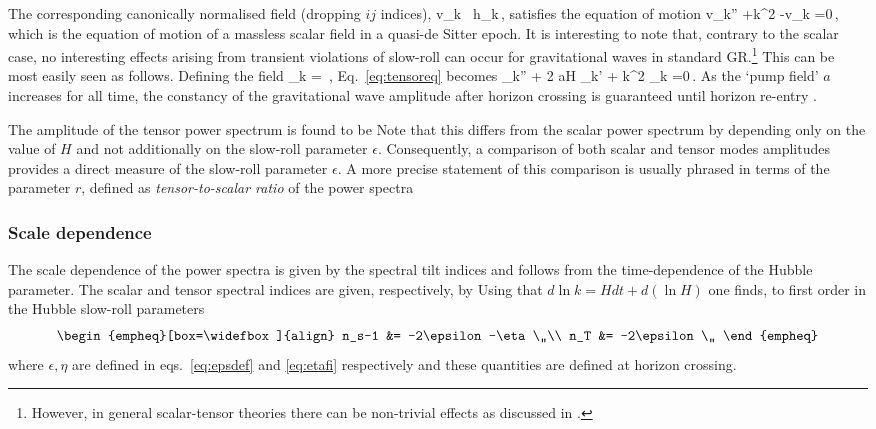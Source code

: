 The corresponding canonically normalised field (dropping $ij$ indices),
\be
v_k \equiv  {}\Mp \, h_k\,,
\ee
satisfies the equation of motion
\be
\label{eq:tensoreq}
v_k'' +\lp k^2 -\rp v_k =0\,,
\ee
which is the equation of motion of a massless scalar field  in a quasi-de Sitter epoch. It is interesting to note that, contrary to the scalar case, no  interesting effects arising from transient violations of slow-roll can occur for gravitational waves in standard GR.\footnote{However, in general scalar-tensor theories there can be non-trivial effects as discussed in \cite{Mylova:2018yap}.} This can be most easily seen as follows. Defining the field
\be
\psi_k = \,,
\ee
Eq.~\eqref{eq:tensoreq} becomes
\be\label{eq:tensoreq2}
\psi_k'' + 2 aH \psi_k' + k^2 \psi_k =0\,.
\ee
As the `pump field' $a$ increases for all time, the constancy of the gravitational wave amplitude after horizon crossing is guaranteed until horizon re-entry \cite{Leach:2000yw}.

The  amplitude of the tensor power spectrum is  found to be
\be\label{eq:PT}
\setlength\fboxsep{0.25cm}
\setlength\fboxrule{0.4pt}
\ee
Note that  this differs from the scalar power spectrum by depending only on the value of $H$ and not additionally on the slow-roll parameter $\epsilon$. Consequently, a comparison of both scalar and tensor modes  amplitudes provides a direct measure of the slow-roll parameter $\epsilon$. A more precise statement of this comparison is usually phrased in terms of the parameter $r$, defined as {\em tensor-to-scalar ratio} of the power spectra
\be\label{eq:rdef}
\setlength\fboxsep{0.25cm}
\setlength\fboxrule{0.4pt}
\ee

\subsubsection{Scale dependence}

The scale dependence of the power spectra  is given by the spectral tilt indices and follows from the time-dependence of the Hubble parameter. The  scalar and tensor spectral indices are given, respectively, by
\be
\setlength\fboxsep{0.25cm}
\setlength\fboxrule{0.4pt}
\ee
Using that $d\ln k = H dt + d (\ln H)$ one finds, to first order in the Hubble slow-roll parameters
\begin{subequations}
\label{eq:nsnT}
\begin{empheq}[box=\widefbox]{align}
 n_s-1 &= -2\epsilon -\eta  \,,\\
n_T &= -2\epsilon\,,
\end{empheq}
\end{subequations}
where $\epsilon, \eta$ are defined in eqs.~\eqref{eq:epsdef} and \eqref{eq:etafi} respectively and these quantities are defined at horizon crossing.

